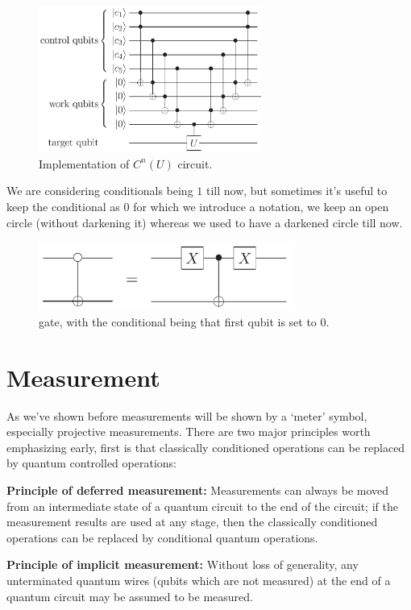 \begin{figure}[H]
    \centering
    \includegraphics[width=0.65\textwidth]{images/c_n_u_implementation.png}
    \caption{Implementation of $C^n(U)$ circuit.}
    \label{fig:c-n-u-implementation}
\end{figure}

We are considering conditionals being $1$ till now, but sometimes it's useful to keep the conditional as $0$ for which we introduce a notation, we keep an open circle (without darkening it) whereas we used to have a darkened circle till now.
\begin{figure}[H]
    \centering
    \includegraphics[width=0.75\textwidth]{images/0_notation.png}
    \caption{ gate, with the conditional being that first qubit is set to $0$.}
    \label{fig:0-notation}
\end{figure}

\section{Measurement}
As we've shown before measurements will be shown by a `meter' symbol, especially projective measurements. There are two major principles worth emphasizing early, first is that classically conditioned operations can be replaced by quantum controlled operations:
\\
\begin{addmargin}[2em]{2em}
    \textbf{Principle of deferred measurement:} Measurements can always be moved from an intermediate state of a quantum circuit to the end of the circuit; if the measurement results are used at any stage, then the classically conditioned operations can be replaced by conditional quantum operations. \\
\end{addmargin}
\begin{addmargin}[2em]{2em}
    \textbf{Principle of implicit measurement:} Without loss of generality, any unterminated quantum wires (qubits which are not measured) at the end of a quantum circuit may be assumed to be measured.
\end{addmargin}

